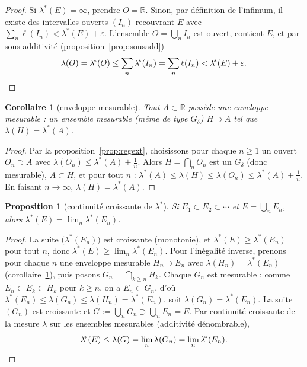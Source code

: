 \documentclass[11pt]{article}
\theoremstyle{thmblue}
\newtheorem{proposition}[theoreme]{Proposition}
\newtheorem{corollaire}[theoreme]{Corollaire}
\theoremstyle{defplain}
\theoremstyle{rem}
\newcommand{\R}{\mathbb{R}}
\newcommand{\eps}{\varepsilon}
\newcommand{\lstar}{\lambda^{\!*}}
\begin{document}
\begin{proof}
Si $\lstar(E)=\infty$, prendre $O=\R$. Sinon, par définition de l'infimum, il existe des intervalles
ouverts $(I_n)$ recouvrant $E$ avec $\sum_n\ell(I_n)<\lstar(E)+\eps$. L'ensemble $O=\bigcup_n I_n$ est
ouvert, contient $E$, et par sous-additivité (proposition~\ref{prop:sousadd})
\[
\lambda(O)=\lstar(O)\le\sum_n\lstar(I_n)=\sum_n\ell(I_n)<\lstar(E)+\eps.\qedhere
\]
\end{proof}

\begin{corollaire}[enveloppe mesurable]\label{cor:enveloppe}
Tout $A\subset\R$ possède une \emph{enveloppe mesurable} : un ensemble mesurable (même de type
$G_\delta$) $H\supset A$ tel que $\lambda(H)=\lstar(A)$.
\end{corollaire}

\begin{proof}
Par la proposition~\ref{prop:regext}, choisissons pour chaque $n\ge1$ un ouvert $O_n\supset A$ avec
$\lambda(O_n)\le\lstar(A)+\tfrac1n$. Alors $H=\bigcap_n O_n$ est un $G_\delta$ (donc mesurable),
$A\subset H$, et pour tout $n$ : $\lstar(A)\le\lambda(H)\le\lambda(O_n)\le\lstar(A)+\tfrac1n$. En
faisant $n\to\infty$, $\lambda(H)=\lstar(A)$.
\end{proof}

\begin{proposition}[continuité croissante de $\lstar$]\label{prop:contcroiss}
Si $E_1\subset E_2\subset\cdots$ et $E=\bigcup_n E_n$, alors $\lstar(E)=\lim_n\lstar(E_n)$.
\end{proposition}

\begin{proof}
La suite $\bigl(\lstar(E_n)\bigr)$ est croissante (monotonie), et $\lstar(E)\ge\lstar(E_n)$ pour tout
$n$, donc $\lstar(E)\ge\lim_n\lstar(E_n)$. Pour l'inégalité inverse, prenons pour chaque $n$ une
enveloppe mesurable $H_n\supset E_n$ avec $\lambda(H_n)=\lstar(E_n)$
(corollaire~\ref{cor:enveloppe}), puis posons $G_n=\bigcap_{k\ge n}H_k$. Chaque $G_n$ est mesurable ;
comme $E_n\subset E_k\subset H_k$ pour $k\ge n$, on a $E_n\subset G_n$, d'où
$\lstar(E_n)\le\lambda(G_n)\le\lambda(H_n)=\lstar(E_n)$, soit $\lambda(G_n)=\lstar(E_n)$. La suite
$(G_n)$ est croissante et $G:=\bigcup_n G_n\supset\bigcup_n E_n=E$. Par continuité croissante de la
mesure $\lambda$ sur les ensembles mesurables (additivité dénombrable),
\[
\lstar(E)\le\lambda(G)=\lim_n\lambda(G_n)=\lim_n\lstar(E_n).\qedhere
\]
\end{proof}
\end{document}
